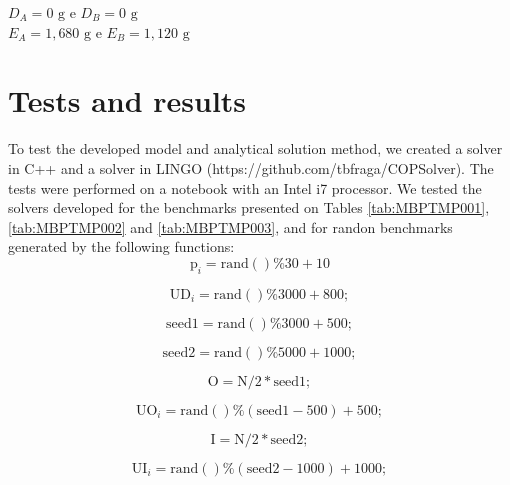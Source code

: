 \documentclass[authoryear,preprint,12pt]{elsarticle}
\begin{document}
$D_A = 0 \textrm{ g}$ e $D_B = 0 \textrm{ g}$ \\

$E_A = 1,680 \textrm{ g}$ e $E_B = 1,120 \textrm{ g}$ \\

\section{Tests and results}
\label{sec:results}

To test the developed model and analytical solution method, we created a solver in C++ and a solver in LINGO (https://github.com/tbfraga/COPSolver). The tests were performed on a notebook with an Intel i7 processor. We tested the solvers developed for the benchmarks presented on Tables \ref{tab:MBPTMP001}, \ref{tab:MBPTMP002} and \ref{tab:MBPTMP003}, and for randon benchmarks generated by the following functions: \\

\begin{equation}
\textrm{p}_i = \textrm{rand}()\%30 + 10
\end{equation}

\begin{equation}
\textrm{UD}_i = \textrm{rand}()\%3000 + 800;
\end{equation}

\begin{equation}
 \textrm{seed1} = \textrm{rand}()\%3000 + 500;
\end{equation}

\begin{equation}
\textrm{seed2} = \textrm{rand}()\%5000 + 1000;
\end{equation}

\begin{equation}
\textrm{O} = \textrm{N}/2*\textrm{seed1};
\end{equation}

\begin{equation}
\textrm{UO}_i = \textrm{rand}()\%(\textrm{seed1}-500) + 500;
\end{equation}

\begin{equation}
\textrm{I} = \textrm{N}/2*\textrm{seed2};
\end{equation}

\begin{equation}
\textrm{UI}_i = \textrm{rand}()\%(\textrm{seed2}-1000) + 1000;
\end{equation}
\end{document}
